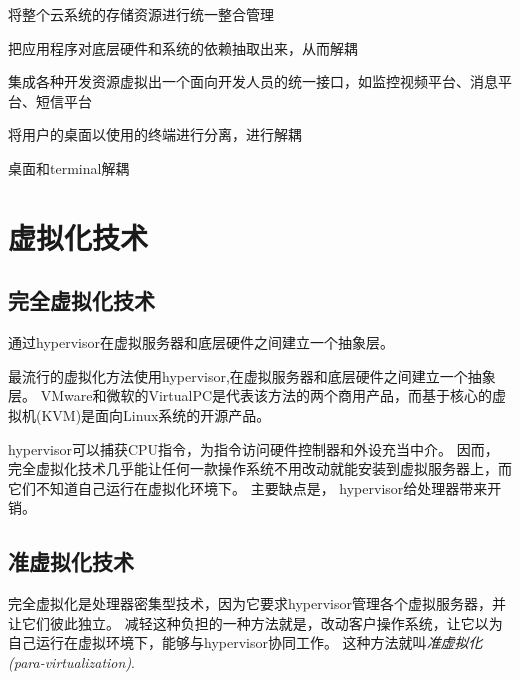 \begin{definition}[存储虚拟化]
    将整个云系统的存储资源进行统一整合管理
\end{definition}

\begin{definition}[应用程序虚拟化]
    把应用程序对底层硬件和系统的依赖抽取出来，从而解耦
\end{definition}

\begin{definition}[平台虚拟化]
    集成各种开发资源虚拟出一个面向开发人员的统一接口，如监控视频平台、消息平台、短信平台
\end{definition}

\begin{definition}[桌面虚拟化]
    将用户的桌面以使用的终端进行分离，进行解耦

    桌面和terminal解耦
\end{definition}

\section{虚拟化技术}


\subsection{完全虚拟化技术}

\begin{definition}[完全虚拟化技术]
    通过hypervisor在虚拟服务器和底层硬件之间建立一个抽象层。 
\end{definition}

最流行的虚拟化方法使用hypervisor,在虚拟服务器和底层硬件之间建立一个抽象层。 VMware和微软的VirtualPC是代表该方法的两个商用产品，而基于核心的虚拟机(KVM)是面向Linux系统的开源产品。 

hypervisor可以捕获CPU指令，为指令访问硬件控制器和外设充当中介。 因而，完全虚拟化技术几乎能让任何一款操作系统不用改动就能安装到虚拟服务器上，而它们不知道自己运行在虚拟化环境下。 主要缺点是， hypervisor给处理器带来开销。 


\subsection{准虚拟化技术}

\begin{definition}[准虚拟化技术]
    完全虚拟化是处理器密集型技术，因为它要求hypervisor管理各个虚拟服务器，并让它们彼此独立。 减轻这种负担的一种方法就是，改动客户操作系统，让它以为自己运行在虚拟环境下，能够与hypervisor协同工作。 这种方法就叫\textit{准虚拟化(para-virtualization)}. 
\end{definition}

